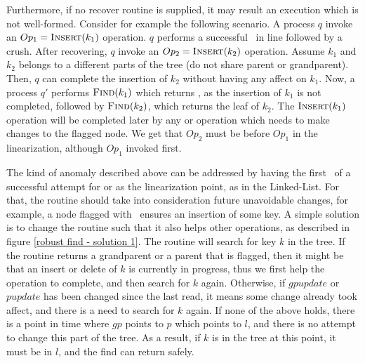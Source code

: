 Furthermore, if no recover routine is supplied, it may result an execution which is not well-formed. Consider for example the following scenario. A process $q$ invoke an $Op_1 = \mbox{\sc Insert}(k_1)$ operation. $q$ performs a successful \CASB\ in line  followed by a crush. After recovering, $q$ invoke an $Op_2 = \mbox{\sc Insert}(k_2)$ operation. Assume $k_1$ and $k_2$ belongs to a different parts of the tree (do not share parent or grandparent). Then, $q$ can complete the insertion of $k_2$ without having any affect on $k_1$. Now, a process $q'$ performs $\mbox{\sc Find}(k_1)$ which returns \NULL, as the insertion of $k_1$ is not completed, followed by $\mbox{\sc Find}(k_2)$, which returns the leaf of $k_2$. The $\mbox{\sc Insert}(k_1)$ operation will be completed later by any  or  operation which needs to make changes to the flagged node. We get that $Op_2$ must be before $Op_1$ in the linearization, although $Op_1$ invoked first.

The kind of anomaly described above can be addressed by having the first \CASB\ of a successful attempt for  or  as the linearization point, as in the Linked-List. For that, the  routine should take into consideration future unavoidable changes, for example, a node flagged with \insertflag\ ensures an insertion of some key. A simple solution is to change the  routine such that it also helps other operations, as described in figure \ref{robust find - solution 1}. The  routine will search for key $k$ in the tree. If the  routine returns a grandparent or a parent that is flagged, then it might be that an insert or delete of $k$ is currently in progress, thus we first help the operation to complete, and then search for $k$ again. Otherwise, if $gpupdate$ or $pupdate$ has been changed since the last read, it means some change already took affect, and there is a need to search for $k$ again. If none of the above holds, there is a point in time where $gp$ points to $p$ which points to $l$, and there is no attempt to change this part of the tree. As a result, if $k$ is in the tree at this point, it must be in $l$, and the find can return safely. 

